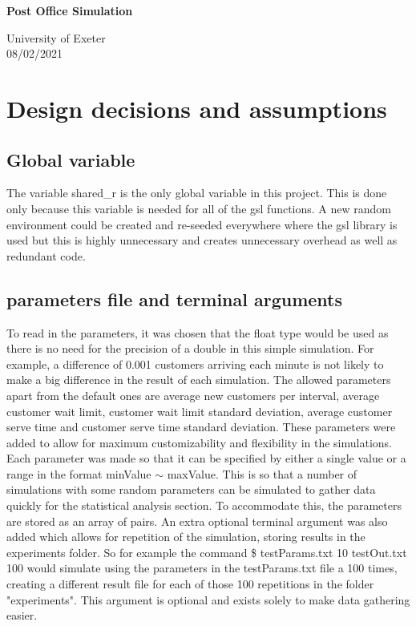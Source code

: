 \documentclass{article}
\begin{document}
\begin{titlepage}
	\begin{center}
		\vspace*{2cm}
		
		\Huge
		\textbf{Post Office Simulation}
		
		\vspace{0.7cm}
		
		\vfill
		
		University of Exeter\\
		08/02/2021\\
		
	\end{center}
\end{titlepage}

\newpage

\section{Design decisions and assumptions}
\subsection{Global variable}
The variable shared\_r is the only global variable in this project. This is done only because this variable is needed for all of the gsl functions. A new random environment could be created and re-seeded everywhere where the gsl library is used but this is highly unnecessary and creates unnecessary overhead as well as redundant code.

\subsection{parameters file and terminal arguments}
To read in the parameters, it was chosen that the float type would be used as there is no need for the precision of a double in this simple simulation. For example, a difference of 0.001 customers arriving each minute is not likely to make a big difference in the result of each simulation.
The allowed parameters apart from the default ones are average new customers per interval, average customer wait limit, customer wait limit standard deviation, average customer serve time and customer serve time standard deviation. These parameters were added to allow for maximum customizability and flexibility in the simulations. Each parameter was made so that it can be specified by either a single value or a range in the format minValue $\sim$ maxValue. This is so that a number of simulations with some random parameters can be simulated to gather data quickly for the statistical analysis section. To accommodate this, the parameters are stored as an array of pairs.  
An extra optional terminal argument was also added which allows for repetition of the simulation, storing results in the experiments folder. So for example the command \$ testParams.txt 10 testOut.txt 100 would simulate using the parameters in the testParams.txt file a 100 times, creating a different result file for each of those 100 repetitions in the folder "experiments". This argument is optional and exists solely to make data gathering easier.
\end{document}
